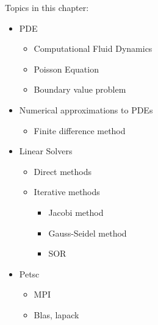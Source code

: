 Topics in this chapter:

\begin{itemize}
	\item PDE
	\begin{itemize}
		\item Computational Fluid Dynamics
		\item Poisson Equation
		\item Boundary value problem
	\end{itemize}
	\item Numerical approximations to PDEs
	\begin{itemize}	
		\item Finite difference method
	\end{itemize}
	\item Linear Solvers
	\begin{itemize}
		\item Direct methods
		\item Iterative methods
		\begin{itemize}
			\item Jacobi method
			\item Gauss-Seidel method
			\item SOR
		\end{itemize}
	\end{itemize}
	\item Petsc
	\begin{itemize}
		\item MPI
		\item Blas, lapack
	\end{itemize}
\end{itemize}

